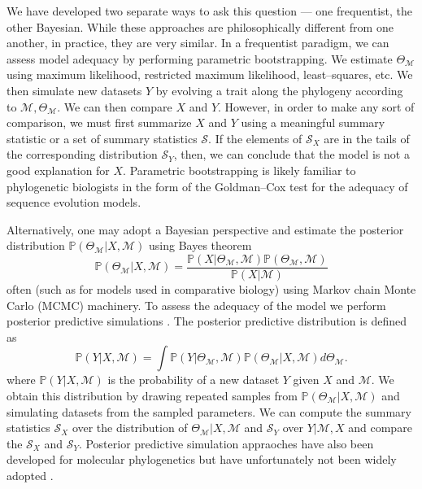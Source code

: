 \documentclass[a4paper,12pt]{article}
\begin{document}
We have developed two separate ways to ask this question --- one frequentist, the other Bayesian. While these approaches are philosophically different from one another, in practice, they are very similar. In a frequentist paradigm, we can assess model adequacy by performing parametric bootstrapping. We estimate $\Theta_{\mathcal{M}}$ using maximum likelihood, restricted maximum likelihood, least--squares, etc. We then simulate new datasets $Y$ by evolving a trait along the phylogeny according to $\mathcal{M},\Theta_{\mathcal{M}}$. We can then compare $X$ and $Y$. However, in order to make any sort of comparison, we must first summarize $X$ and $Y$ using a meaningful summary statistic or a set of summary statistics $\mathcal{S}$. If the elements of $\mathcal{S}_X$ are in the tails of the corresponding distribution $\mathcal{S}_Y$, then, we can conclude that the model is not a good explanation for $X$. Parametric bootstrapping is likely familiar to phylogenetic biologists in the form of the Goldman--Cox test \citep{Goldman} for the adequacy of sequence evolution models.

Alternatively, one may adopt a Bayesian perspective and estimate the posterior distribution $\mathbb{P}(\Theta_{\mathcal{M}}|X,\mathcal{M})$ using Bayes theorem
\begin{equation}
\mathbb{P}(\Theta_{\mathcal{M}}|X,\mathcal{M}) = \frac{\mathbb{P}(X|\Theta_{\mathcal{M}}, \mathcal{M})\mathbb{P}(\Theta_\mathcal{M}, \mathcal{M})}{\mathbb{P}(X|\mathcal{M})}
\end{equation}
often (such as for models used in comparative biology) using Markov chain Monte Carlo (MCMC) machinery. To assess the adequacy of the model we perform posterior predictive simulations \citep{Rubin1984, Gelman1996}. The posterior predictive distribution is defined as
\begin{equation}
\mathbb{P}(Y|X,\mathcal{M}) = \int \mathbb{P}(Y|\Theta_{\mathcal{M}}, \mathcal{M})\mathbb{P}(\Theta_{\mathcal{M}}|X,\mathcal{M})d\Theta_{\mathcal{M}}.
\end{equation}
where $\mathbb{P}(Y|X,\mathcal{M})$ is the probability of a new dataset $Y$ given $X$ and $\mathcal{M}$. We obtain this distribution by drawing repeated samples from $\mathbb{P}(\Theta_{\mathcal{M}}|X,\mathcal{M})$ and simulating datasets from the sampled parameters. We can compute the summary statistics $\mathcal{S}_X$ over the distribution of $\Theta_{\mathcal{M}}|X,\mathcal{M}$ and $\mathcal{S}_Y$ over $Y|\mathcal{M},X$ and compare the $\mathcal{S}_X$ and $\mathcal{S}_Y$. Posterior predictive simulation appraoches have also been developed for molecular phylogenetics \citep{Bollback2002, Reid2013, Lewis2013, Brown2013} but have unfortunately not been widely adopted \citep{Brown2013}.
\end{document}
